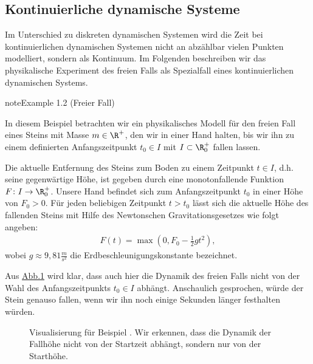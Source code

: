 \documentclass[letterpaper,10pt,german]{jupyterBook}
\begin{document}
\subsection{Kontinuierliche dynamische Systeme}
\label{\detokenize{ode/dynamicSystems:kontinuierliche-dynamische-systeme}}
\sphinxAtStartPar
Im Unterschied zu diskreten dynamischen Systemen wird die Zeit bei kontinuierlichen dynamischen Systemen nicht an abzählbar vielen Punkten modelliert, sondern als Kontinuum.
Im Folgenden beschreiben wir das physikalische Experiment des freien Falls als Spezialfall eines kontinuierlichen dynamischen Systems.
\label{ode/dynamicSystems:ex:freefall}
\begin{sphinxadmonition}{note}{Example 1.2 (Freier Fall)}



\sphinxAtStartPar
In diesem Beispiel betrachten wir ein physikalisches Modell für den freien Fall eines Steins mit Masse \(m \in \R^+\), den wir in einer Hand halten, bis wir ihn zu einem definierten Anfangszeitpunkt \(t_0 \in I\) mit \(I \subset \R^+_0\) fallen lassen.

\sphinxAtStartPar
Die aktuelle Entfernung des Steins zum Boden zu einem Zeitpunkt \(t \in I\), d.h. seine gegenwärtige Höhe, ist gegeben durch eine monoton\sphinxhyphen{}fallende Funktion \(F \colon I \rightarrow \R^+_0\).
Unsere Hand befindet sich zum Anfangszeitpunkt \(t_0\) in einer Höhe von \(F_0 > 0\).
Für jeden beliebigen Zeitpunkt \(t > t_0\) lässt sich die aktuelle Höhe des fallenden Steins mit Hilfe des Newtonschen Gravitationsgesetzes wie folgt angeben:
\begin{equation*}
\begin{split}F(t) = \max(0, F_0 - \frac{1}{2}gt^2),\end{split}
\end{equation*}
\sphinxAtStartPar
wobei \(g \approx 9,81 \frac{m}{s^2}\) die Erdbeschleunigungskonstante bezeichnet.

\sphinxAtStartPar
Aus \hyperref[\detokenize{ode/dynamicSystems:fig-free-fall}]{Abb.\@ \ref{\detokenize{ode/dynamicSystems:fig-free-fall}}} wird klar, dass auch hier die Dynamik des freien Falls nicht von der Wahl des Anfangszeitpunkts \(t_0 \in I\) abhängt.
Anschaulich gesprochen, würde der Stein genauso fallen, wenn wir ihn noch einige Sekunden länger festhalten würden.
\end{sphinxadmonition}

\begin{figure}[htbp]
\centering
\capstart
\begin{sphinxVerbatimOutput}

\noindent{}
\end{sphinxVerbatimOutput}
\caption{Visualisierung für Beispiel {\hyperref[\detokenize{ode/dynamicSystems:ex:freefall}]{}}. Wir erkennen, dass die Dynamik der Fallhöhe nicht von der Startzeit abhängt, sondern nur von der Starthöhe.}\label{\detokenize{ode/dynamicSystems:fig-free-fall}}\end{figure}
\end{document}
